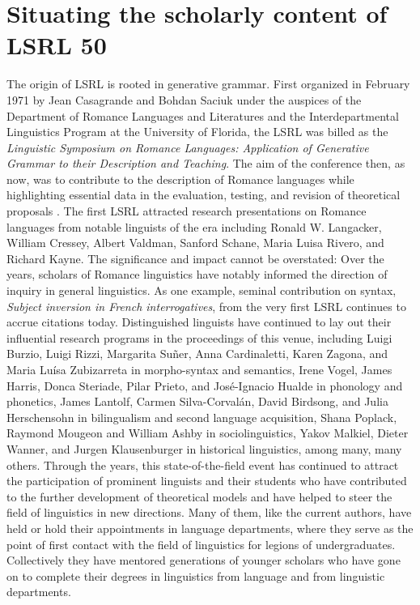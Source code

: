\documentclass[output=paper,draftmode]{langscibook}
\begin{document}
\section{Situating the scholarly content of LSRL 50}
The origin of LSRL is rooted in generative grammar. First organized in February 1971 by Jean Casagrande and Bohdan Saciuk under the auspices of the Department of Romance Languages and Literatures and the Interdepartmental Linguistics Program at the University of Florida, the LSRL was billed as the \textit{Linguistic Symposium on Romance Languages: Application of Generative Grammar to their Description and Teaching}. The aim of the conference then, as now, was to contribute to the description of Romance languages while highlighting essential data in the evaluation, testing, and revision of theoretical proposals \citet{casagrande1972generative}. The first LSRL attracted research presentations on Romance languages from notable linguists of the era including Ronald W. Langacker, William Cressey, Albert Valdman, Sanford Schane, Maria Luisa Rivero, and Richard Kayne. The significance and impact cannot be overstated: Over the years, scholars of Romance linguistics have notably informed the direction of inquiry in general linguistics. As one example,  seminal contribution on syntax, \textit{Subject inversion in French interrogatives}, from the very first LSRL continues to accrue citations today. Distinguished linguists have continued to lay out their influential research programs in the proceedings of this venue, including Luigi Burzio, Luigi Rizzi, Margarita Suñer, An\-na  Cardinaletti, Karen Zagona, and Maria Luísa Zubizarreta in morpho-syntax and semantics, Irene Vogel, James Harris, Donca Steriade, Pilar Prieto, and José-Ignacio Hualde in phonology and phonetics, James Lantolf, Carmen Silva-Corvalán, David Birdsong, and Julia Herschensohn in bilingualism and second language acquisition, Shana Poplack, Raymond Mougeon and William Ashby in sociolinguistics, Yakov Malkiel, Dieter Wanner, and Jurgen Klausenburger in historical linguistics, among many, many others. Through the years, this state-of-the-field event has continued to attract the participation of prominent linguists and their students who have contributed to the further development of theoretical models and have helped to steer the field of linguistics in new directions. Many of them, like the current authors, have held or hold their appointments in language departments, where they serve as the point of first contact with the field of linguistics for legions of undergraduates. Collectively they have mentored generations of younger scholars who have gone on to complete their degrees in linguistics from language and from linguistic departments.
\end{document}
